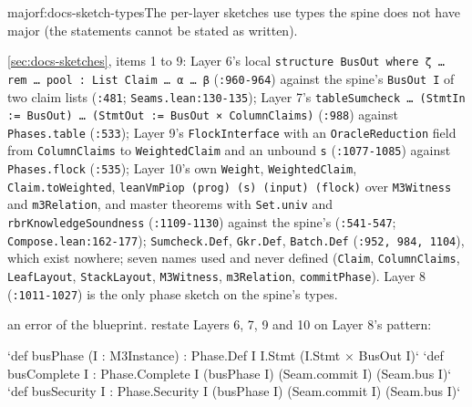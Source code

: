 \begin{finding}{major}{f:docs-sketch-types}{The per-layer sketches use types the spine does not have}
 major (the statements cannot be stated as written).
 \begin{sloppypar}
\cref{sec:docs-sketches}, items 1 to 9: Layer 6's local \texttt{structure Bus\allowbreak{}Out where ζ … rem … pool :\allowbreak{} List Claim … α … β} (\texttt{:\allowbreak{}960-\allowbreak{}964}) against the spine's \texttt{BusOut I} of two claim lists (\texttt{:\allowbreak{}481}; \texttt{Seams.\allowbreak{}lean:\allowbreak{}130-\allowbreak{}135}); Layer 7's \texttt{table\allowbreak{}Sumcheck … (\allowbreak{}Stmt\allowbreak{}In :\allowbreak{}= Bus\allowbreak{}Out) … (\allowbreak{}Stmt\allowbreak{}Out :\allowbreak{}= Bus\allowbreak{}Out × Column\allowbreak{}Claims)} (\texttt{:\allowbreak{}988}) against \texttt{Phases.\allowbreak{}table} (\texttt{:\allowbreak{}533}); Layer 9's \texttt{FlockInterface} with an \texttt{Oracle\allowbreak{}Reduction} field from \texttt{ColumnClaims} to \texttt{WeightedClaim} and an unbound \texttt{s} (\texttt{:\allowbreak{}1077-\allowbreak{}1085}) against \texttt{Phases.\allowbreak{}flock} (\texttt{:\allowbreak{}535}); Layer 10's own \texttt{Weight}, \texttt{WeightedClaim}, \texttt{Claim.\allowbreak{}to\allowbreak{}Weighted}, \texttt{lean\allowbreak{}Vm\allowbreak{}Piop (\allowbreak{}prog) (\allowbreak{}s) (\allowbreak{}input) (\allowbreak{}flock)} over \texttt{M3Witness} and \texttt{m3Relation}, and master theorems with \texttt{Set.\allowbreak{}univ} and \texttt{rbr\allowbreak{}Knowledge\allowbreak{}Soundness} (\texttt{:\allowbreak{}1109-\allowbreak{}1130}) against the spine's (\texttt{:\allowbreak{}541-\allowbreak{}547}; \texttt{Compose.\allowbreak{}lean:\allowbreak{}162-\allowbreak{}177}); \texttt{Sumcheck.\allowbreak{}Def}, \texttt{Gkr.\allowbreak{}Def}, \texttt{Batch.\allowbreak{}Def} (\texttt{:\allowbreak{}952,\allowbreak{} 984,\allowbreak{} 1104}), which exist nowhere; seven names used and never defined (\texttt{Claim}, \texttt{ColumnClaims}, \texttt{LeafLayout}, \texttt{StackLayout}, \texttt{M3Witness}, \texttt{m3Relation}, \texttt{commitPhase}). Layer 8 (\texttt{:\allowbreak{}1011-\allowbreak{}1027}) is the only phase sketch on the spine's types.
\end{sloppypar}
 an error of the blueprint.
 restate Layers 6, 7, 9 and 10 on Layer 8's pattern:

\begin{srccode}
`def busPhase (I : M3Instance) : Phase.Def I I.Stmt (I.Stmt × BusOut I)`
`def busComplete I : Phase.Complete I (busPhase I) (Seam.commit I) (Seam.bus I)`
`def busSecurity I : Phase.Security I (busPhase I) (Seam.commit I) (Seam.bus I)`
\end{srccode}


\end{finding}
